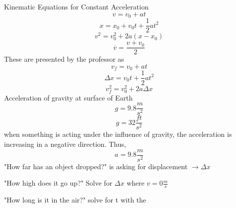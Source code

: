 \documentclass[12pt,a4paper,english]{article}
\begin{document}
\begin{flushleft}
Kinematic Equations for Constant Acceleration
\[ v=v_{0}+at
\]
\[ x=x_{0}+v_{0}t + \frac{1}{2}at^2
\]
\[ v^2=v_{0}^2+2a(x-x_{0})
\]
\[\overline{v}=\frac{v+v_{0}}{2}
\]
These are presented by the professor as
\[ 
  v_{f}=v_{0}+at
\]
\[ 
  \Delta x=v_{0}t+\frac{1}{2}at^2
\]
\[
  v_{f}^2=v_{0}^2+2a\Delta x
\]
Acceleration of gravity at surface of Earth
\[ g=9.8\frac{m}{s^2}
\]
\[ g=32\frac{ft}{s^2}
\]
when something is acting under the influence of gravity, the acceleration is increasing in a negative direction. Thus,
\[ a = 9.8\frac{m}{s^2}

\]
"How far has an object dropped?" is asking for displacement $ \to \Delta x$ 

"How high does it go up?" Solve for $\Delta x$ where $ v=0\frac{m}{s}$ 

"How long is it in the air?" solve for t with the 
\end{flushleft}
\end{document}
